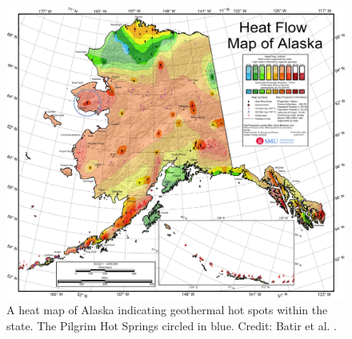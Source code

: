 \begin{figure}[p]
	\centering
	
	\includegraphics[width=\textwidth]{figures/AKHeatMapSMU_HFMAK2013} 

	\caption[A heat map of Alaska indicating geothermal hot spots within the state. The Pilgrim Hot Springs circled in blue. Credit: Batir et al..]{A heat map of Alaska indicating geothermal hot spots within the state. The Pilgrim Hot Springs circled in blue. Credit: Batir et al. \cite{Batir2013}.
	}
	\label{fig:AKheatmap}


\end{figure}